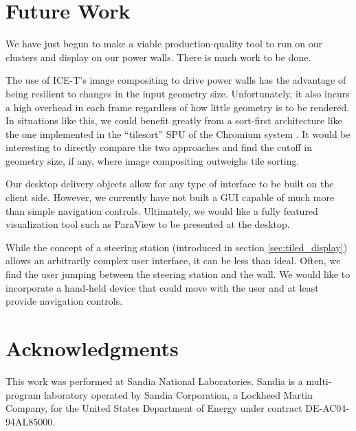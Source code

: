 \documentclass[twocolumn]{article}
\begin{document}
\section{Future Work}
\label{sec:future_work}

We have just begun to make a viable production-quality tool to run on our
clusters and display on our power walls.  There is much work to be done.

The use of ICE-T's image compositing to drive power walls has the advantage
of being resilient to changes in the input geometry size.  Unfortunately,
it also incurs a high overhead in each frame regardless of how little
geometry is to be rendered.  In situations like this, we could benefit
greatly from a sort-first architecture like the one implemented in the
``tilesort'' SPU of the Chromium system \cite{Humphreys02}.  It would be
interesting to directly compare the two approaches and find the cutoff in
geometry size, if any, where image compositing outweighs tile sorting.

Our desktop delivery objects allow for any type of interface to be built on
the client side.  However, we currently have not built a GUI capable of
much more than simple navigation controls.  Ultimately, we would like a
fully featured visualization tool such as ParaView \cite{Law01} to be
presented at the desktop.

While the concept of a steering station (introduced in section
\ref{sec:tiled_display}) allows an arbitrarily complex user interface, it
can be less than ideal.  Often, we find the user jumping between the
steering station and the wall.  We would like to incorporate a hand-held
device that could move with the user and at least provide navigation
controls.


\section{Acknowledgments}

This work was performed at Sandia National Laboratories. Sandia is a
multi-program laboratory operated by Sandia Corporation, a Lockheed Martin
Company, for the United States Department of Energy under contract
DE-AC04-94AL85000.




\end{document}
